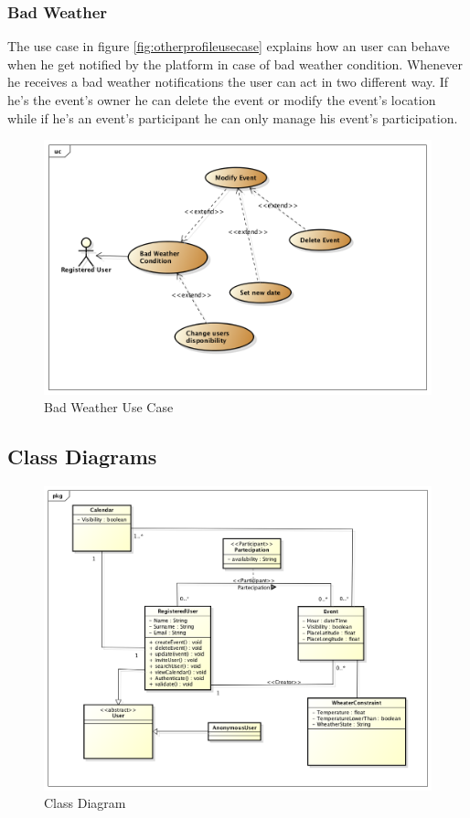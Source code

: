 \subsubsection{Bad Weather}
The use case in figure \ref{fig:otherprofileusecase} explains how an user can behave when he get notified by the platform in case of bad weather condition. Whenever he receives a bad weather notifications the user can act in two different way. If he's the event's owner he can delete the event or modify the event's location while if he's an event's participant he can only manage his event's participation.
 \begin{center}
 \begin{figure}
    \includegraphics[width=1.1\textwidth]{../UMLDiagram/use_case/BadWeather/BadWeather.png}
    \caption{Bad Weather Use Case}
     \label{fig:badweatherusecase}
     \end{figure}
   \end{center}  
\subsection{Class Diagrams}
\begin{center}
 \begin{figure}
    \includegraphics[width=1\textwidth]{../UMLDiagram/class/WeatherCalClassDiagram/ClassDiagram0.png}
    \caption{Class Diagram}
     \label{fig:classdiagram}
     \end{figure}
   \end{center}  

